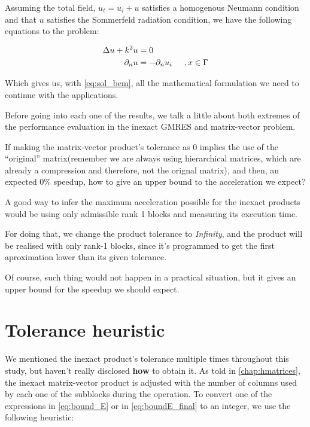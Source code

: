Assuming the total field, $u_{t} = u_{i} + u $ satisfies a homogenous Neumann condition and that $u$ satisfies the Sommerfeld radiation condition, we have the following equations to the problem:

\begin{align}\label{eq:cavity_pdes}
    \begin{split}
        \Delta u + k^{2}u &= 0\\
        \partial_{n} u &= -\partial_{n}u_{i}\hspace{0.2in}, x \in \Gamma
    \end{split}
\end{align}

Which gives us, with \ref{eq:sol_bem}, all the mathematical formulation we need to continue with the applications.

Before going into each one of the results, we talk a little about both extremes of the performance evaluation in the inexact GMRES and matrix-vector problem.

If making the matrix-vector product's tolerance as 0 implies the use of the “original” matrix(remember we are always using hierarchical matrices, which are already a compression and therefore, not the orignal matrix), and then, an expected 0$\%$ speedup, how to give an upper bound to the acceleration we expect?

A good way to infer the maximum acceleration possible for the inexact products would be using only admissible rank 1 blocks and measuring its execution time.

For doing that, we change the product tolerance to \textit{Infinity}, and the product will be realised with only rank-1 blocks, since it's programmed to get the first aproximation lower than its given tolerance.

Of course, such thing would not happen in a practical situation, but it gives an upper bound for the speedup we should expect.

\section{Tolerance heuristic}

We mentioned the inexact product's tolerance multiple times throughout this study, but haven't really disclosed \textbf{how} to obtain it.
As told in \autoref{chap:hmatrices}, the inexact matrix-vector product is adjusted with the number of columns used by each one of the subblocks during the operation. To convert one of the expressions in \autoref{eq:bound_E} or in \autoref{eq:boundE_final} to an integer, we use the following heuristic:

